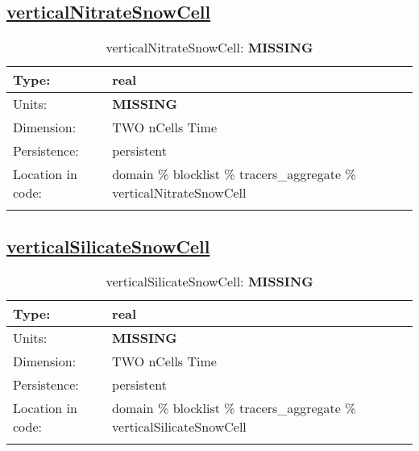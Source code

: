 \subsection[verticalNitrateSnowCell]{\hyperref[sec:var_tab_tracers_aggregate]{verticalNitrateSnowCell}}
\label{subsec:var_sec_tracers_aggregate_verticalNitrateSnowCell}
\begin{center}
\begin{longtable}{| p{2.0in} | p{4.0in} |}
        \hline 
        Type: & real \\
        \hline 
        Units: & {\bf \color{red} MISSING} \\
        \hline 
        Dimension: & TWO nCells Time \\
        \hline 
        Persistence: & persistent \\
        \hline 
         Location in code: & domain \% blocklist \% tracers\_aggregate \% verticalNitrateSnowCell \\
         \hline 
    \caption{verticalNitrateSnowCell: {\bf \color{red} MISSING}}
\end{longtable}
\end{center}
\subsection[verticalSilicateSnowCell]{\hyperref[sec:var_tab_tracers_aggregate]{verticalSilicateSnowCell}}
\label{subsec:var_sec_tracers_aggregate_verticalSilicateSnowCell}
\begin{center}
\begin{longtable}{| p{2.0in} | p{4.0in} |}
        \hline 
        Type: & real \\
        \hline 
        Units: & {\bf \color{red} MISSING} \\
        \hline 
        Dimension: & TWO nCells Time \\
        \hline 
        Persistence: & persistent \\
        \hline 
         Location in code: & domain \% blocklist \% tracers\_aggregate \% verticalSilicateSnowCell \\
         \hline 
    \caption{verticalSilicateSnowCell: {\bf \color{red} MISSING}}
\end{longtable}
\end{center}
